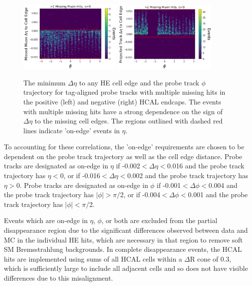 \begin{figure}[htpb]
    \includegraphics[width=0.45\textwidth]{figures/posEtaEdgeEventsData.png} 
    \hspace{0.01\textwidth}
    \includegraphics[width=0.45\textwidth]{figures/negEtaEdgeEventsData.png}
    \centering
	\caption[$\eta$ edge correlations in missing HCAL muon hits.]{The minimum $\Delta\eta$ to any HE cell edge and the probe track $\phi$ trajectory for tag-aligned probe tracks with multiple missing hits in the positive (left) and negative (right) HCAL endcaps. The events with multiple missing hits have a strong dependence on the sign of $\Delta\eta$ to the missing cell edges. The regions outlined with dashed red lines indicate 'on-edge' events in $\eta$.}
    \label{fig:etaEdgeCorr}
\end{figure}

To accounting for these correlations, the 'on-edge' requirements are chosen to be dependent on the probe track trajectory as well as the cell edge distance. 
Probe tracks are designated as on-edge in $\eta$ if -0.002$<\Delta\eta<$0.016 and the probe track trajectory has $\eta<0$, or if -0.016$<\Delta\eta<$0.002 and the probe track trajectory
has $\eta>0$.
Probe tracks are designated as on-edge in $\phi$ if -0.001$<\Delta\phi<$0.004 and the probe track trajectory has $|\phi|>\pi/$2, or if -0.004$<\Delta\phi<$0.001 and the probe track trajectory has $|\phi|<\pi/$2.

Events which are on-edge in $\eta$, $\phi$, or both are excluded from the partial disappearance region due to the significant differences observed between data and MC in the individual HE hits, which are necessary in that region to remove soft SM Bremsstrahlung backgrounds.
In complete disappearance events, the HCAL hits are implemented using sums of all HCAL cells within a $\Delta$R cone of 0.3, which is sufficiently large to include all adjacent cells and so does not have visible differences due to this misalignment.

